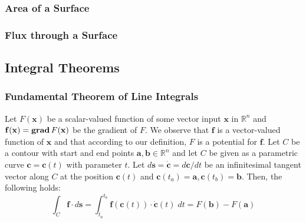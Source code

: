 \subsubsection{Area of a Surface}
\subsubsection{Flux through a Surface}

\subsection{Integral Theorems}

\subsubsection{Fundamental Theorem of Line Integrals}
Let $F(\mathbf{x})$ be a scalar-valued function of some vector input $\mathbf{x}$ in $\mathbb{R}^n$ and $\mathbf{f(x)} = \operatorname{\mathbf{grad}} F(\mathbf{x})$ be the gradient of $F$. We observe that $\mathbf{f}$ is a vector-valued function of $\mathbf{x}$ and that according to our definition, $F$ is a potential for $\mathbf{f}$. Let $C$ be a contour with start and end points $\mathbf{a,b} \in \mathbb{R}^n$ and let $C$ be given as a parametric curve $\mathbf{c} = \mathbf{c}(t)$ with parameter $t$. Let $d\mathbf{s} = \dot{\mathbf{c}} = d\mathbf{c} / dt$ be an infinitesimal tangent vector along $C$ at the position $\mathbf{c}(t)$ and $\mathbf{c}(t_a) = \mathbf{a}, \mathbf{c}(t_b) = \mathbf{b}$. Then, the following holds:
\begin{equation}
 \int_C \mathbf{f} \cdot d\mathbf{s}  =
 \int_{t_a}^{t_b}  \mathbf{f} (\mathbf{c}(t) ) \cdot \dot{\mathbf{c}}(t) \; dt =
 F(\mathbf{b}) - F(\mathbf{a}) 
\end{equation}
